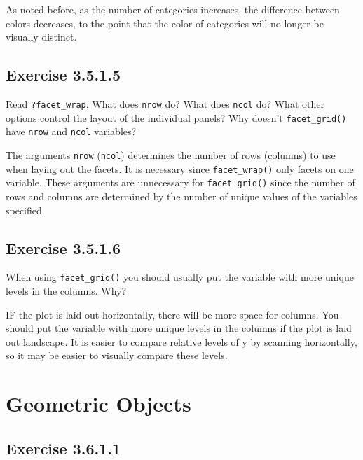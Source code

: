 \documentclass[]{book}
\theoremstyle{plain}
\theoremstyle{remark}
\begin{document}
As noted before, as the number of categories increases, the difference between
colors decreases, to the point that the color of categories will no longer be
visually distinct.

\hypertarget{exercise-3.5.1.5}{%
\subsection*{\texorpdfstring{Exercise {3.5.1.5}}{Exercise 3.5.1.5}}\label{exercise-3.5.1.5}}

Read \texttt{?facet\_wrap}. What does \texttt{nrow} do? What does \texttt{ncol} do? What other options control the layout of the individual panels? Why doesn't \texttt{facet\_grid()} have \texttt{nrow} and \texttt{ncol} variables?

The arguments \texttt{nrow} (\texttt{ncol}) determines the number of rows (columns) to use when laying out the facets.
It is necessary since \texttt{facet\_wrap()} only facets on one variable.
These arguments are unnecessary for \texttt{facet\_grid()} since the number of rows and columns are determined by the number of unique values of the variables specified.

\hypertarget{exercise-3.5.1.6}{%
\subsection*{\texorpdfstring{Exercise {3.5.1.6}}{Exercise 3.5.1.6}}\label{exercise-3.5.1.6}}

When using \texttt{facet\_grid()} you should usually put the variable with more unique levels in the columns. Why?

IF the plot is laid out horizontally, there will be more space for columns.
You should put the variable with more unique levels in the columns if the plot is laid out landscape.
It is easier to compare relative levels of y by scanning horizontally, so it may be easier to visually compare these levels.

\hypertarget{geometric-objects}{%
\section{Geometric Objects}\label{geometric-objects}}

\hypertarget{exercise-3.6.1.1}{%
\subsection*{\texorpdfstring{Exercise {3.6.1.1}}{Exercise 3.6.1.1}}\label{exercise-3.6.1.1}}
\end{document}
